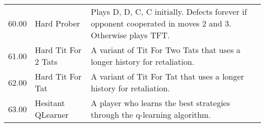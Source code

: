 \begin{tabular}{rll}
	60.00  & Hard Prober                 & Plays D, D, C, C initially. Defects forever if opponent cooperated in moves
	2 and 3. Otherwise plays TFT.                                                                                                                                                                                                                                                                                                                                                                                                                                                                                                                                                                                                                                                                                                                                                                                                                                                                                                            \\
	61.00  & Hard Tit For 2 Tats         & A variant of Tit For Two Tats that uses a longer history for
	retaliation.                                                                                                                                                                                                                                                                                                                                                                                                                                                                                                                                                                                                                                                                                                                                                                                                                                                                                                                                            \\
	62.00  & Hard Tit For Tat            & A variant of Tit For Tat that uses a longer history for retaliation.                                                              \\
	63.00  & Hesitant QLearner           & A player who learns the best strategies through the q-learning algorithm.


\end{tabular}
